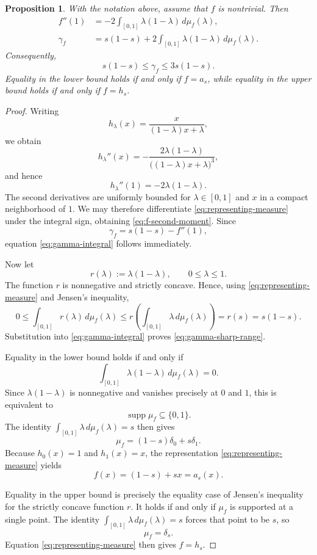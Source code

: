 \documentclass[11pt]{amsart}
\newtheorem{proposition}[theorem]{Proposition}
\theoremstyle{definition}
\theoremstyle{remark}
\begin{document}
	\begin{proposition}
		\label{prop:gamma-moments}
		With the notation above, assume that $f$ is nontrivial.  Then
		\begin{align}
			f''(1)
			&=-2\int_{[0,1]}
			\lambda(1-\lambda)\,d\mu_f(\lambda),
			\label{eq:f-second-moment}\\
			\gamma_f
			&=s(1-s)+2\int_{[0,1]}
			\lambda(1-\lambda)\,d\mu_f(\lambda).
			\label{eq:gamma-integral}
		\end{align}
		Consequently,
		\begin{equation}\label{eq:gamma-sharp-range}
			s(1-s)\le\gamma_f\le3s(1-s).
		\end{equation}
		Equality in the lower bound holds if and only if $f=a_s$, while
		equality in the upper bound holds if and only if $f=h_s$.
	\end{proposition}
	
	\begin{proof}
		Writing
		\[
		h_\lambda(x)
		=\frac{x}{(1-\lambda)x+\lambda},
		\]
		we obtain
		\[
		h_\lambda''(x)
		=-\frac{2\lambda(1-\lambda)}
		{\bigl((1-\lambda)x+\lambda\bigr)^3},
		\]
		and hence
		\[
		h_\lambda''(1)=-2\lambda(1-\lambda).
		\]
		The second derivatives are uniformly bounded for
		$\lambda\in[0,1]$ and $x$ in a compact neighborhood of $1$.
		We may therefore differentiate
		\eqref{eq:representing-measure} under the integral sign, obtaining
		\eqref{eq:f-second-moment}.  Since
		\[
		\gamma_f=s(1-s)-f''(1),
		\]
		equation \eqref{eq:gamma-integral} follows immediately.
		
		Now let
		\[
		r(\lambda):=\lambda(1-\lambda),
		\qquad 0\le\lambda\le1.
		\]
		The function $r$ is nonnegative and strictly concave.  Hence,
		using \eqref{eq:representing-measure} and Jensen's inequality,
		\[
		0
		\le
		\int_{[0,1]}r(\lambda)\,d\mu_f(\lambda)
		\le
		r\left(
		\int_{[0,1]}\lambda\,d\mu_f(\lambda)
		\right)
		=r(s)
		=s(1-s).
		\]
		Substitution into \eqref{eq:gamma-integral} proves
		\eqref{eq:gamma-sharp-range}.
		
		Equality in the lower bound holds if and only if
		\[
		\int_{[0,1]}\lambda(1-\lambda)\,d\mu_f(\lambda)=0.
		\]
		Since $\lambda(1-\lambda)$ is nonnegative and vanishes precisely at
		$0$ and $1$, this is equivalent to
		\[
		\operatorname{supp}\mu_f\subseteq\{0,1\}.
		\]
		The identity
		$\int_{[0,1]}\lambda\,d\mu_f(\lambda)=s$ then gives
		\[
		\mu_f=(1-s)\delta_0+s\delta_1.
		\]
		Because $h_0(x)=1$ and $h_1(x)=x$, the representation
		\eqref{eq:representing-measure} yields
		\[
		f(x)=(1-s)+sx=a_s(x).
		\]
		
		Equality in the upper bound is precisely the equality case of
		Jensen's inequality for the strictly concave function $r$.
		It holds if and only if $\mu_f$ is supported at a single point.
		The identity
		$\int_{[0,1]}\lambda\,d\mu_f(\lambda)=s$ forces that point to be
		$s$, so
		\[
		\mu_f=\delta_s.
		\]
		Equation \eqref{eq:representing-measure} then gives $f=h_s$.
	\end{proof}
	
\end{document}
